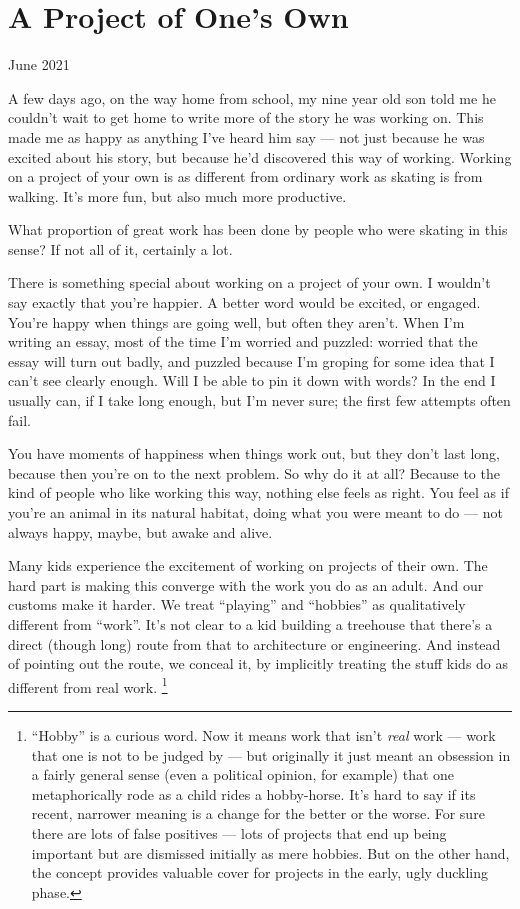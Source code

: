 \chapter{A Project of One's Own}

June 2021

A few days ago, on the way home from school, my nine year old son told
me he couldn't wait to get home to write more of the story he was
working on. This made me as happy as anything I've heard him say --- not
just because he was excited about his story, but because he'd discovered
this way of working. Working on a project of your own is as different
from ordinary work as skating is from walking. It's more fun, but also
much more productive.

What proportion of great work has been done by people who were skating
in this sense? If not all of it, certainly a lot.

There is something special about working on a project of your own. I
wouldn't say exactly that you're happier. A better word would be
excited, or engaged. You're happy when things are going well, but often
they aren't. When I'm writing an essay, most of the time I'm worried and
puzzled: worried that the essay will turn out badly, and puzzled because
I'm groping for some idea that I can't see clearly enough. Will I be
able to pin it down with words? In the end I usually can, if I take long
enough, but I'm never sure; the first few attempts often fail.

You have moments of happiness when things work out, but they don't last
long, because then you're on to the next problem. So why do it at all?
Because to the kind of people who like working this way, nothing else
feels as right. You feel as if you're an animal in its natural habitat,
doing what you were meant to do --- not always happy, maybe, but awake
and alive.

Many kids experience the excitement of working on projects of their own.
The hard part is making this converge with the work you do as an adult.
And our customs make it harder. We treat ``playing'' and ``hobbies'' as
qualitatively different from ``work''. It's not clear to a kid building
a treehouse that there's a direct (though long) route from that to
architecture or engineering. And instead of pointing out the route, we
conceal it, by implicitly treating the stuff kids do as different from
real work. \footnote{``Hobby'' is a curious word. Now it means work that isn't
\emph{real} work --- work that one is not to be judged by --- but
originally it just meant an obsession in a fairly general sense (even a
political opinion, for example) that one metaphorically rode as a child
rides a hobby-horse. It's hard to say if its recent, narrower meaning is
a change for the better or the worse. For sure there are lots of false
positives --- lots of projects that end up being important but are
dismissed initially as mere hobbies. But on the other hand, the concept
provides valuable cover for projects in the early, ugly duckling phase.}


